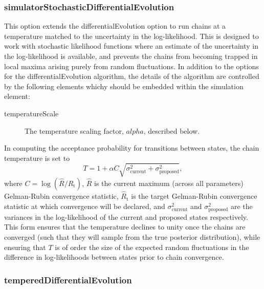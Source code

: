 \subsubsection{{\normalfont \ttfamily simulatorStochasticDifferentialEvolution}}

This option extends the {\normalfont \ttfamily differentialEvolution} option to run chains at a temperature matched to the uncertainty in the log-likelihood. This is designed to work with stochastic likelihood functions where an estimate of the uncertainty in the log-likelihood is available, and prevents the chains from becoming trapped in local maxima arising purely from random fluctuations.  In addition to the options for the {\normalfont \ttfamily differentialEvolution} algorithm, the details of the algorithm are controlled by the following elements whichy should be embedded within the {\normalfont \ttfamily simulation} element:
\begin{description}
\item[{\normalfont \ttfamily temperatureScale}] The temperature scaling factor, $alpha$, described below.
\end{description}
In computing the acceptance probability for transitions between states, the chain temperature is set to
\begin{equation}
  T = 1 + \alpha C \sqrt{\sigma^2_\mathrm{current}+\sigma^2_\mathrm{proposed}},
\end{equation}
where $C = \log(\hat{R}/\hat{R}_\mathrm{t})$, $\hat{R}$ is the current maximum (across all parameters) Gelman-Rubin convergence statistic, $\hat{R}_\mathrm{t}$ is the target Gelman-Rubin convergence statistic at which convergence will be declared, and $\sigma^2_\mathrm{current}$ and $\sigma^2_\mathrm{proposed}$ are the variances in the log-likelihood of the current and proposed states respectively. This form ensures that the temperature declines to unity once the chains are converged (such that they will sample from the true posterior distribution), while ensuring that $T$ is of order the size of the expected random fluctuations in the difference in log-likelihoods between states prior to chain convergence.

\subsubsection{{\normalfont \ttfamily temperedDifferentialEvolution}}

